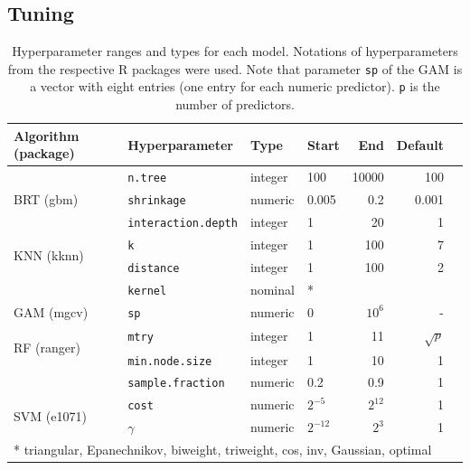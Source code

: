 \documentclass[review]{elsarticle}
\begin{document}
\subsection{Tuning}
\label{subsec:methods_tuning}

\begin{table}[b!]
\centering
\caption[t]{Hyperparameter ranges and types for each model.
	Notations of hyperparameters from the respective R packages were used.
	Note that parameter \texttt{sp} of the GAM is a vector with eight entries (one entry for each numeric predictor). \texttt{p} is the number of predictors.}
\begingroup\footnotesize
\begin{tabular}{llllrrr}
	\\
	Algorithm (package)            & Hyperparameter             & Type    & Start     & End      & Default    \\
	\hline
	\multirow{3}{*}{BRT (gbm)}     & \texttt{n.tree}            & integer & 100       & 10000    & 100        \\
	                               & \texttt{shrinkage}         & numeric & 0.005         & 0.2     & 0.001      \\
	                               & \texttt{interaction.depth} & integer & 1         & 20       & 1          \\
	\midrule
	\multirow{2}{*}{KNN (kknn)}    & \texttt{k}                 & integer & 1         & 100      & 7          \\
								   & \texttt{distance}          & integer & 1         & 100      & 2          \\
								   & \texttt{kernel}            & nominal & *     &           &          \\
	\midrule
	\multirow{1}{*}{GAM (mgcv)}    & \texttt{sp}                & numeric & 0         & $10^{6}$ & -          \\
	\midrule
	\multirow{2}{*}{RF (ranger)}   & \texttt{mtry}              & integer & 1         & 11       & $\sqrt{p}$ \\
	                               & \texttt{min.node.size}     & integer & 1         & 10       & 1          \\
	                               & \texttt{sample.fraction}   & numeric & 0.2       & 0.9      & 1          \\
	\midrule
	\multirow{2}{*}{SVM (e1071)} & \texttt{cost}                 & numeric & $2^{-5}$ & $2^{12}$ & 1          \\
	                               & \texttt{$\gamma$}          & numeric & $2^{-12}$ & $2^{3}$ & 1          \\
	\bottomrule
	\multicolumn{6}{l}{* triangular, Epanechnikov, biweight, triweight, cos, inv, Gaussian, optimal}     \\
\end{tabular}
\endgroup
\label{tab:hyperparameter_limits}
\end{table}
\end{document}

